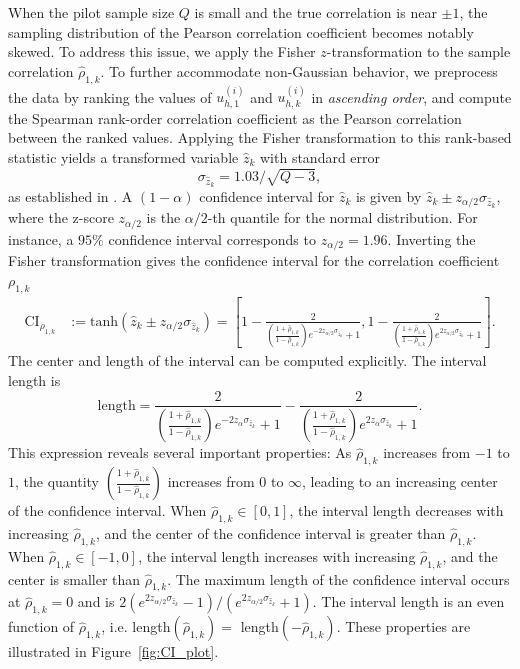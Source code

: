 When the pilot sample size $Q$ is small and the true correlation is near $\pm 1$, the sampling distribution of the Pearson correlation coefficient becomes notably skewed. To address this issue, we apply the Fisher $z$-transformation to the sample correlation $\widehat \rho_{1,k}$. To further accommodate non-Gaussian behavior, we preprocess the data by ranking the values of $u_{h,1}^{(i)}$ and ${u}_{h,k}^{(i)}$ in {\it ascending order}, and compute the Spearman rank-order correlation coefficient as the Pearson correlation between the ranked values. Applying the Fisher transformation to this rank-based statistic yields a transformed variable $\widehat z_k$ with standard error 
%
\[
\sigma_{\widehat z_k} = 1.03/\sqrt{Q - 3},
\]
%
as established in \cite{BiHi:2017, FiHaPe:1957}. A $(1 - \alpha)$ confidence interval for $\widehat z_k$ is given by $\widehat z_k \pm z_{\alpha/2}\sigma_{\widehat z_k}$, where the z-score $z_{\alpha/2}$ is the $\alpha/2$-th quantile for the normal distribution. For instance, a $95\%$ confidence interval corresponds to $z_{\alpha/2} = 1.96$. Inverting the Fisher transformation gives the confidence interval for the correlation coefficient $\rho_{1,k}$
%
\begin{align}
    \label{eq:Confidence_Interval_rho}
    \text{CI}_{\rho_{1,k}} &:= \text{tanh}\left(\widehat z_k \pm  z_{\alpha/2}\sigma_{\widehat z_k}\right)
    =\left[1-\frac{2}{\left(\frac{1+\widehat\rho_{1,k}}{1-\widehat\rho_{1,k}}\right)e^{-2z_{\alpha/2}\sigma_{\widehat z_k}}+1}, 1-\frac{2}{\left(\frac{1+\widehat\rho_{1,k}}{1-\widehat\rho_{1,k}}\right)e^{2z_{\alpha/2}\sigma_{\widehat z_k}}+1}\right].
\end{align}
%
The center and length of the interval can be computed explicitly. The interval length is
%
\[
\text{length} = \frac{2}{\left(\frac{1+\widehat\rho_{1,k}}{1-\widehat\rho_{1,k}}\right)e^{-2z_\alpha\sigma_{\widehat z_k}}+1}-\frac{2}{\left(\frac{1+\widehat\rho_{1,k}}{1-\widehat\rho_{1,k}}\right)e^{2z_\alpha\sigma_{\widehat z_k}}+1}.
\]
%
This expression reveals several important properties: As $\widehat \rho_{1,k}$ increases from $-1$ to $1$, the quantity $\left(\frac{1 + \widehat \rho_{1,k}}{1 - \widehat \rho_{1,k}}\right)$ increases from $0$ to $\infty$, leading to an increasing center of the confidence interval. When $\widehat \rho_{1,k} \in [0,1]$, the interval length decreases with increasing $\widehat \rho_{1,k}$, and the center of the confidence interval is greater than $\widehat \rho_{1,k}$. When $\widehat \rho_{1,k} \in [-1,0]$, the interval length increases with increasing $\widehat \rho_{1,k}$, and the center is smaller than $\widehat \rho_{1,k}$. The maximum length of the confidence interval occurs at $\widehat \rho_{1,k} = 0$ and is  $2(e^{2z_{\alpha/2}\sigma_{\widehat z_k}}-1)/(e^{2z_{\alpha/2}\sigma_{\widehat z_k}}+1)$. The interval length is an even function of $\widehat \rho_{1,k}$, i.e. length$(\widehat \rho_{1,k})=$ length$(-\widehat \rho_{1,k})$. These properties are illustrated in Figure~\ref{fig:CI_plot}.

